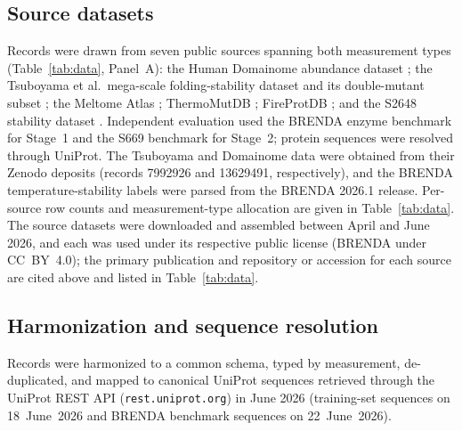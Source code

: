 \documentclass[sn-nature]{sn-jnl}%
\begin{document}
\subsection{Source datasets}
Records were drawn from seven public sources spanning both measurement types
(Table~\ref{tab:data}, Panel~A): the Human Domainome abundance dataset
\cite{beltran2025domainome}; the Tsuboyama et al.\ mega-scale folding-stability dataset and
its double-mutant subset \cite{tsuboyama2023}; the Meltome Atlas \cite{jarzab2020meltome};
ThermoMutDB \cite{xavier2021thermomutdb}; FireProtDB \cite{stourac2021fireprotdb}; and the
S2648 stability dataset \cite{dehouck2009s2648}. Independent evaluation used the BRENDA
enzyme benchmark \cite{chang2021brenda} for Stage~1 and the S669 benchmark
\cite{pancotti2022s669} for Stage~2; protein sequences were resolved through UniProt. The
Tsuboyama and Domainome data were obtained from their Zenodo deposits (records 7992926 and
13629491, respectively), and the BRENDA temperature-stability labels were parsed from the
BRENDA 2026.1 release. Per-source row counts and measurement-type allocation are given in
Table~\ref{tab:data}. The source datasets were downloaded and assembled between April and June
2026, and each was used under its respective public license (BRENDA under CC~BY~4.0); the
primary publication and repository or accession for each source are cited above and listed in
Table~\ref{tab:data}.

\subsection{Harmonization and sequence resolution}
Records were harmonized to a common schema, typed by measurement, de-duplicated, and mapped
to canonical UniProt sequences retrieved through the UniProt REST API
(\texttt{rest.uniprot.org}) in June 2026 (training-set sequences on 18~June~2026 and BRENDA
benchmark sequences on 22~June~2026).
\end{document}
